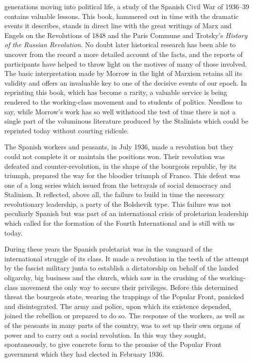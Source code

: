  generations moving into political life, a study of the Spanish Civil War of 1936–39 contains valuable lessons. This book, hammered out in time with the dramatic events it describes, stands in direct line with the great writings of Marx and Engels on the Revolutions of 1848 and the Paris Commune and Trotsky’s \emph{History of the Russian Revolution}. No doubt later historical research has been able to uncover from the record a more detailed account of the facts, and the reports of participants have helped to throw light on the motives of many of those involved. The basic interpretation made by Morrow in the light of Marxism retains all its validity and offers an invaluable key to one of the decisive events of our epoch. In reprinting this book, which has become a rarity, a valuable service is being rendered to the working-class movement and to students of politics. Needless to say, while Morrow’s work has so well withstood the test of time there is not a single part of the voluminous literature produced by the Stalinists which could be reprinted today without courting ridicule.

The Spanish workers and peasants, in July 1936, made a revolution but they could not complete it or maintain the positions won. Their revolution was defeated and counter-revolution, in the shape of the bourgeois republic, by its triumph, prepared the way for the bloodier triumph of Franco. This defeat was one of a long series which issued from the betrayals of social democracy and Stalinism. It reflected, above all, the failure to build in time the necessary revolutionary leadership, a party of the Bolshevik type. This failure was not peculiarly Spanish but was part of an international crisis of proletarian leadership which called for the formation of the Fourth International and is still with us today.
\nowidow

During these years the Spanish proletariat was in the vanguard of the international struggle of its class. It made a revolution in the teeth of the attempt by the fascist military junta to establish a dictatorship on behalf of the landed oligarchy, big business and the church, which saw in the crushing of the working-class movement the only way to secure their privileges. Before this determined threat the bourgeois state, wearing the trappings of the Popular Front, panicked and disintegrated. The army and police, upon which its existence depended, joined the rebellion or prepared to do so. The response of the workers, as well as of the peasants in many parts of the country, was to set up their own organs of power and to carry out a social revolution. In this way they sought, spontaneously, to give concrete form to the promise of the Popular Front government which they had elected in February 1936.

